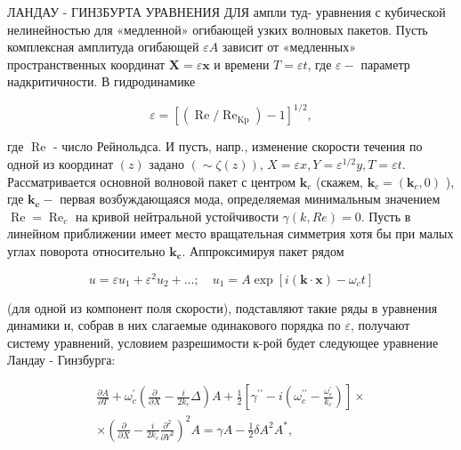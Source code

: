 \documentclass[10pt]{article}
\begin{document}
ЛАНДАУ - ГИНЗБУРТА УРАВНЕНИЯ ДЛЯ ампли туд- уравнения с кубической нелинейностью для «медленной» огибающей узких волновых пакетов. Пусть комплексная амплитуда огибающей $\varepsilon A$ зависит от «медленных» пространственных координат $\boldsymbol{X}=\varepsilon \boldsymbol{x}$ и времени $T=\varepsilon t$, где $\varepsilon-$ параметр надкритичности. В гидродинамике



\[

\varepsilon=\left[\left(\operatorname{Re} / \operatorname{Re}_{\mathrm{Kp}}\right)-1\right]^{1 / 2},

\]



где $\operatorname{Re}$ - число Рейнольдса. И пусть, напр., изменение скорости течения по одной из координат $(z)$ задано $(\sim \zeta(z))$, $X=\varepsilon x, Y=\varepsilon^{1 / 2} y, T=\varepsilon t$. Рассматривается основной волновой пакет с центром $\boldsymbol{k}_{c}$ (скажем, $\boldsymbol{k}_{c}=\left(\boldsymbol{k}_{c}, 0\right)$ ), где $\boldsymbol{k}_{\boldsymbol{c}}-$ первая возбуждающаяся мода, определяемая минимальным значением $\operatorname{Re}=\operatorname{Re}_{c}$ на кривой нейтральной устойчивости $\gamma(k, R e)=0$. Пусть в линейном приближении имеет место вращательная симметрия хотя бы при малых углах поворота относительно $\boldsymbol{k}_{\boldsymbol{c}}$. Аппроксимируя пакет рядом



\[

u=\varepsilon u_{1}+\varepsilon^{2} u_{2}+\ldots ; \quad u_{1}=A \exp \left[i(\boldsymbol{k} \cdot \boldsymbol{x})-\omega_{c} t\right]

\]



(для одной из компонент поля скорости), подставляют такие ряды в уравнения динамики и, собрав в них слагаемые одинакового порядка по $\varepsilon$, получают систему уравнений, условием разрешимости к-рой будет следующее уравнение Ландау - Гинзбурга:



\[

\begin{gathered}

\frac{\partial A}{\partial T}+\omega_{c}^{\prime}\left(\frac{\partial}{\partial X}-\frac{i}{2 k_{c}} \Delta\right) A+\frac{1}{2}\left[\gamma^{\prime \prime}-i\left(\omega_{c}^{\prime \prime}-\frac{\omega_{c}^{\prime}}{k_{c}}\right)\right] \times \\

\times\left(\frac{\partial}{\partial X}-\frac{i}{2 k_{c}} \frac{\partial^{2}}{\partial Y^{2}}\right)^{2} A=\gamma A-\frac{1}{2} \delta A^{2} A^{*},

\end{gathered}

\]
\end{document}
